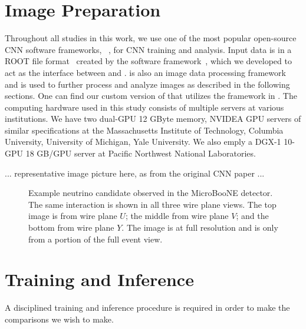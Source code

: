 \documentclass[11pt,a4paper]{article}
\begin{document}
\section{Image Preparation}

Throughout all studies in this work, we use one of the most popular open-source CNN software frameworks, {}~\cite{caffe}, for CNN training and analysis. Input data is in a ROOT file format~\cite{ROOT} created by the {} software framework~\cite{LArCV}, which we developed to act as the interface between {} and {}. {} is also an image data processing framework and is used to further process and analyze images as described in the following sections. One can find our custom version of {} that utilizes the {} framework in \cite{LArCV}.  
The computing hardware used in this study consists of multiple servers at various institutions. We have two dual-GPU 12 GByte memory, NVIDEA GPU servers of similar specifications at the Massachusetts Institute of Technology, Columbia University,  University of Michigan, Yale University. We also emply a DGX-1 10-GPU 18 GB/GPU server at Pacific Northwest National Laboratories.

... representative image picture here, as from the original CNN paper ...

\begin{figure}[t]
  \centering  
\caption{Example neutrino candidate observed in the MicroBooNE detector.  The same interaction is shown in all three wire plane views.  The top image is from wire plane $U$; the middle from wire plane $V$; and the bottom from wire plane $Y$. The image is at full resolution and is only from a portion of the full event view.}
  \label{fig:UBEVD}
\end{figure}


\section {Training and Inference}

A disciplined training and inference procedure is required in order to make the comparisons we wish to make.
\end{document}
